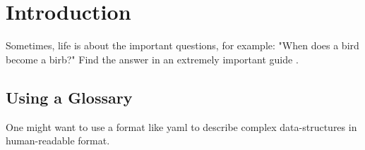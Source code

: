 \section{Introduction}
\label{sec:introduction}

Sometimes, life is about the important questions, for example: "When does a bird become a birb?"
Find the answer in an extremely important guide \cite{asherelbeinWhenIsaBirdaBirb}.

\subsection{Using a Glossary}
One might want to use a format like \gls{yaml} to describe complex data-structures in human-readable format.
